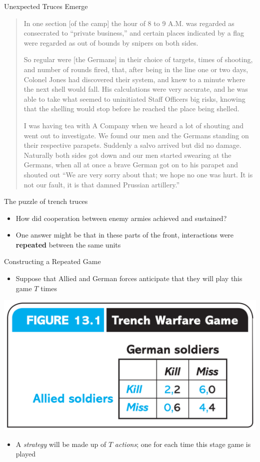 \begin{frame}{Unexpected Truces Emerge}
  \begin{quote}
    \footnotesize 
    In one section [of the camp] the hour of 8 to 9 A.M. was regarded as consecrated to “private business,” and certain places indicated by a flag were regarded as out of bounds by snipers on both sides.

    So regular were [the Germans] in their choice of targets, times of shooting, and number of rounds fired, that, after being in the line one or two days, Colonel Jones had discovered their system, and knew to a minute where the next shell would fall. His calculations were very accurate, and he was able to take what seemed to uninitiated Staff Officers big risks, knowing that the shelling would stop before he reached the place being shelled.

    I was having tea with A Company when we heard a lot of shouting and went out to investigate. We found our men and the Germans standing on their respective parapets. Suddenly a salvo arrived but did no damage. Naturally both sides got down and our men started swearing at the Germans, when all at once a brave German got on to his parapet and shouted out “We are very sorry about that; we hope no one was hurt. It is not our fault, it is that damned Prussian artillery.”
  \end{quote} 
\end{frame}

\begin{frame}{The puzzle of trench truces}
  \begin{itemize}
    \item How did cooperation between enemy armies achieved and sustained?
    \item One answer might be that in these parts of the front, interactions were \textbf{repeated} between the same units
  \end{itemize} 
\end{frame}

\begin{frame}{Constructing a Repeated Game}
  \begin{itemize}
    \item Suppose that Allied and German forces anticipate that they will play this game $T$ times 
  \end{itemize}
  \begin{center}
    \includegraphics[width=.5\textwidth]{figures/fig131.png}  
  \end{center}
  \begin{itemize}
    \item A \textit{strategy} will be made up of $T$ \textit{actions}; 
    one for each time this stage game is played
  \end{itemize}
\end{frame}

